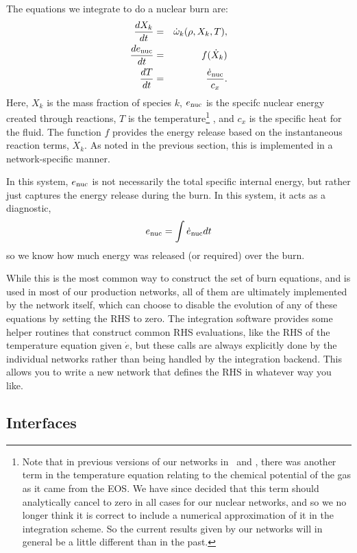 The equations we integrate to do a nuclear burn are:
\begin{eqnarray}
  \frac{dX_k}{dt} &=& \dot\omega_k(\rho,X_k,T), \label{eq:spec_integrate} \\
  \frac{d{{{e}_\mathrm{nuc}}}}{dt} &=& f(\dot{X}_k) \label{eq:enuc_integrate} \\
  \frac{dT}{dt} &=&\frac{{{\dot{e}_\mathrm{nuc}}}}{c_x}. \label{eq:temp_integrate}
\end{eqnarray}
Here, $X_k$ is the mass fraction of species $k$, ${{{e}_\mathrm{nuc}}}$ is the specifc
nuclear energy created through reactions, $T$ is the
temperature\footnote{Note that in previous versions of our networks in
  \castro\ and \maestro, there was another term in the temperature
  equation relating to the chemical potential of the gas as it came
  from the EOS. We have since decided that this term should
  analytically cancel to zero in all cases for our nuclear networks,
  and so we no longer think it is correct to include a numerical
  approximation of it in the integration scheme. So the current
  results given by our networks will in general be a little different
  than in the past.}  , and $c_x$ is the specific heat for the
fluid. The function $f$ provides the energy release based on the
instantaneous reaction terms, $\dot{X}_k$.  As noted in the previous
section, this is implemented in a network-specific manner.

In this system, ${{{e}_\mathrm{nuc}}}$ is not necessarily the total specific internal
energy, but rather just captures the energy release during the burn.  In
this system, it acts as a diagnostic,
\begin{equation}
{{{e}_\mathrm{nuc}}} = \int {{\dot{e}_\mathrm{nuc}}} dt
\end{equation}
so we know how much energy was released (or required) over the burn.



While this is the most common way to construct the set of
burn equations, and is used in most of our production networks,
all of them are ultimately implemented by the network itself, which
can choose to disable the evolution of any of these equations by
setting the RHS to zero. The integration software provides some
helper routines that construct common RHS evaluations, like the RHS
of the temperature equation given $\dot{e}$, but these calls
are always explicitly done by the individual networks rather than
being handled by the integration backend. This allows you to write a
new network that defines the RHS in whatever way you like.


\subsection{Interfaces}

